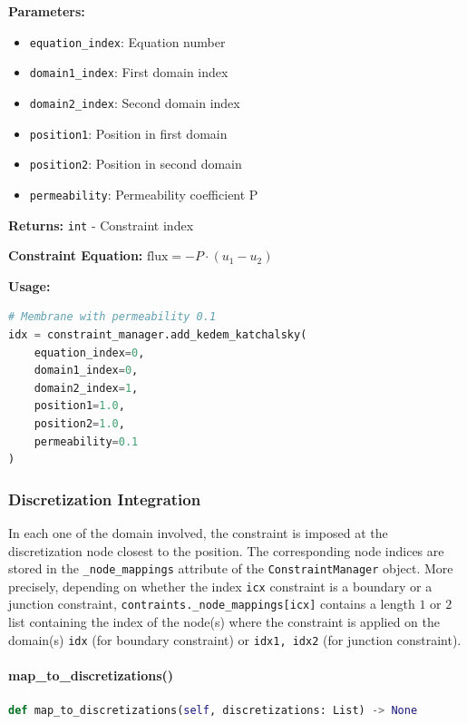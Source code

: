 \textbf{Parameters:}
\begin{itemize}
    \item \texttt{equation\_index}: Equation number
    \item \texttt{domain1\_index}: First domain index
    \item \texttt{domain2\_index}: Second domain index
    \item \texttt{position1}: Position in first domain
    \item \texttt{position2}: Position in second domain
    \item \texttt{permeability}: Permeability coefficient P
\end{itemize}

\textbf{Returns:} \texttt{int} - Constraint index

\textbf{Constraint Equation:} $\text{flux} = -P \cdot (u_1 - u_2)$

\textbf{Usage:}
\begin{lstlisting}[language=Python, caption=Add Kedem-Katchalsky Usage]
# Membrane with permeability 0.1
idx = constraint_manager.add_kedem_katchalsky(
    equation_index=0,
    domain1_index=0,
    domain2_index=1, 
    position1=1.0,
    position2=1.0,
    permeability=0.1
)
\end{lstlisting}

\subsubsection{Discretization Integration}

In each one of the domain involved, the constraint is imposed at the discretization node closest to the position. The corresponding node indices are stored in the {\tt \_node\_mappings} attribute of the {\tt ConstraintManager} object. More precisely, depending on whether the index {\tt icx} constraint is a boundary or a junction constraint,  {\tt contraints.\_node\_mappings[icx]} contains a length $1$ or $2$ list containing the index of the node(s) where the constraint is applied on the domain(s) {\tt idx} (for boundary constraint) or {\tt idx1, idx2} (for junction constraint).

\paragraph{map\_to\_discretizations()}\leavevmode
\begin{lstlisting}[language=Python, caption=Map to Discretizations Method]
def map_to_discretizations(self, discretizations: List) -> None
\end{lstlisting}

